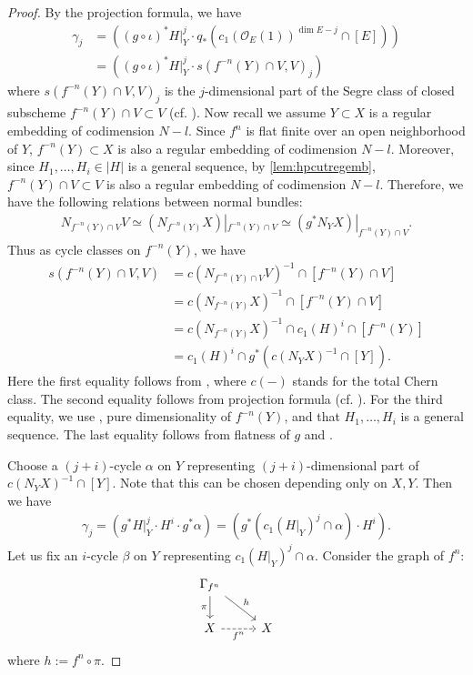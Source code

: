 \documentclass[12pt]{amsart}
\theoremstyle{plain}
\theoremstyle{definition}
\numberwithin{equation}{section}
\def\O{{ \mathcal{O}}}
\def\a{{ \mathfrak{a}}}
\renewcommand{\a}{\alpha}
\renewcommand{\b}{\beta}
\newcommand{\g}{\gamma}
\newcommand{\G}{\Gamma}
\begin{document}
\begin{proof}
By the projection formula, we have
\begin{align}
\g_{j} & = ((g \circ \iota)^{*}H|_{Y}^{j} \cdot q_{*} ( c_{1}(\O_{E}(1))^{\dim E - j} \cap [E] ))\\
& = ((g \circ \iota)^{*}H|_{Y}^{j} \cdot  s(f^{-n}(Y)\cap V, V)_{j})
\end{align}
where $s(f^{-n}(Y)\cap V, V)_{j}$ is the $j$-dimensional part of the Segre class of closed subscheme $f^{-n}(Y) \cap V \subset V$
(cf. \cite[Corollary 4.2.2]{fulintersec}).
Now recall we assume $Y \subset X$ is a regular embedding of codimension $N - l$.
Since $f^{n}$ is flat finite over an open neighborhood of $Y$, $f^{-n}(Y) \subset X$ is also a regular embedding of codimension $N - l$.
Moreover, since $H_{1}, \dots, H_{i} \in |H|$ is a general sequence, by \cref{lem:hpcutregemb},
$f^{-n}(Y) \cap V \subset V$ is also a regular embedding of codimension $N-l$. 
Therefore, we have the following relations between normal bundles:
\begin{align}
N_{f^{-n}(Y)\cap V} V \simeq (N_{f^{-n}(Y)}X )|_{f^{-n}(Y) \cap V} \simeq (g^{*}N_{Y}X)|_{f^{-n}(Y) \cap V}.
\end{align}
Thus as cycle classes on $f^{-n}(Y)$, we have
\begin{align}
s(f^{-n}(Y) \cap V, V) &= c(N_{f^{-n}(Y)\cap V} V )^{-1} \cap [f^{-n}(Y) \cap V]\\
& = c(N_{f^{-n}(Y)}X)^{-1} \cap [f^{-n}(Y) \cap V] \\
& = c(N_{f^{-n}(Y)}X)^{-1} \cap c_{1}(H)^{i} \cap [f^{-n}(Y)]\\
& = c_{1}(H)^{i} \cap g^{*}(c(N_{Y}X)^{-1} \cap [Y]).
\end{align}
Here the first equality follows from \cite[Proposition 4.1(a)]{fulintersec}, 
where $c(-)$ stands for the total Chern class.
The second equality follows from projection formula (cf. \cite[Theorem 3.2(c)]{fulintersec}).
For the third equality, 
we use \cite[Lemma 1.7.2]{fulintersec}, 
pure dimensionality of $f^{-n}(Y)$, and that $H_{1}, \dots , H_{i}$ is a general sequence.
The last equality follows from flatness of $g$ and \cite[Theorem 3.2 (d)]{fulintersec}.

Choose a $(j+i)$-cycle $\a$ on $Y$ representing $(j+i)$-dimensional part of $c(N_{Y}X)^{-1} \cap [Y]$.
Note that this can be chosen depending only on $X, Y$.
Then we have
\begin{align}
\g_{j} = (g^{*}H|_{Y}^{j} \cdot H^{i} \cdot g^{*} \a) = ( g^{*}(c_{1}(H|_{Y})^{j} \cap \a) \cdot H^{i}).
\end{align}
Let us fix an $i$-cycle $\b$ on $Y$ representing $c_{1}(H|_{Y})^{j} \cap \a$.
Consider the graph of $f^{n}$:
\begin{equation}
\begin{tikzcd}
\G_{f^{n}} \arrow[d,"\pi",swap] \arrow[rd,"h"]& \\
X \arrow[r,dashed,"f^{n}",swap]& X
\end{tikzcd}
\end{equation}
where $h:=f^{n} \circ \pi$.


\end{proof}
\end{document}
